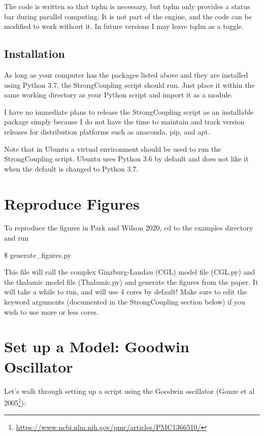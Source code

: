 \documentclass[english,a4paper,oneside]{article}
\renewcommand{\href}[2]{#2\footnote{\url{#1}}}
\begin{document}
The code is written so that tqdm is necessary, but tqdm only provides a
status bar during parallel computing. It is not part of the engine, and
the code can be modified to work without it. In future versions I may
leave tqdm as a toggle.

\subsection{Installation}\label{installation}

As long as your computer has the packages listed above and they are
installed using Python 3.7, the StrongCoupling script should run. Just
place it within the same working directory as your Python script and
import it as a module.

I have no immediate plans to release the StrongCoupling script as an
installable package simply because I do not have the time to maintain
and track version releases for distribution platforms such as anaconda,
pip, and apt.

Note that in Ubuntu a virtual environment should be used to run the
StrongCoupling script. Ubuntu uses Python 3.6 by default and does not
like it when the default is changed to Python 3.7.

\section{Reproduce Figures}\label{reproduce-figures}

To reproduce the figures in Park and Wilson 2020, cd to the examples
directory and run

\$ generate\_figures.py

This file will call the complex Ginzburg-Landau (CGL) model file
(CGL.py) and the thalamic model file (Thalamic.py) and generate the
figures from the paper. It will take a while to run, and will use 4
cores by default! Make sure to edit the keyword arguments (documented in
the StrongCoupling section below) if you wish to use more or less cores.

\section{Set up a Model: Goodwin
Oscillator}\label{set-up-a-model-goodwin-oscillator}

Let's walk through setting up a script using the Goodwin oscillator
(\href{https://www.ncbi.nlm.nih.gov/pmc/articles/PMC1366510/}{Gonze et
al 2005}):
\end{document}
